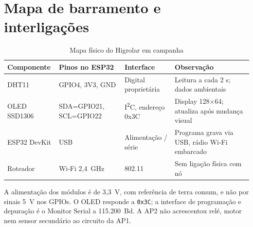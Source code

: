 \chapter{Mapa de barramento e interligações}\label{ap:barramento}
\begin{table}[H]\centering\caption{Mapa físico do Higrolar em campanha}\label{tab:barramento}\footnotesize
\begin{tabular}{@{}L{3cm}L{2.8cm}L{2.6cm}L{5.5cm}@{}}\toprule
\textbf{Componente}&\textbf{Pinos no ESP32}&\textbf{Interface}&\textbf{Observação}\\\midrule
DHT11&GPIO4, 3V3, GND&Digital proprietária&Leitura a cada 2 s; dados ambientais\\
OLED SSD1306&SDA=GPIO21, SCL=GPIO22&I\textsuperscript{2}C, endereço 0x3C&Display 128$\times$64; atualiza após mudança visual\\
ESP32 DevKit&USB&Alimentação / série&Programa grava via USB, rádio Wi-Fi embarcado\\
Roteador&Wi-Fi 2,4~GHz&802.11&Sem ligação física com nó\\
\bottomrule\end{tabular}\end{table}
A alimentação dos módulos é de 3,3~V, com referência de terra comum, e não por sinais 5~V nos GPIOs. O OLED responde a \texttt{0x3C}; a interface de programação e depuração é o Monitor Serial a 115.200~Bd. A AP2 não acrescentou relé, motor nem sensor secundário ao circuito da AP1.
